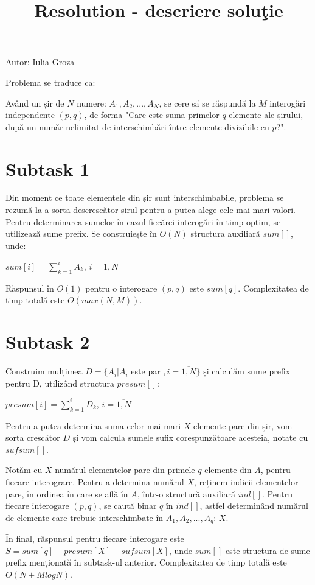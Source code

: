 \documentclass[ro]{problem}
\title{Resolution - descriere soluţie}
\begin{document}
\maketitle

Autor: Iulia Groza

Problema se traduce ca:

\setlength\parindent{24pt} Având un șir de $N$ numere: $A_1, A_2, ..., A_N$, se cere să se răspundă la $M$ interogări independente $(p, q)$, de forma "Care este suma primelor $q$ elemente ale șirului, după un număr nelimitat de interschimbări între elemente divizibile cu $p$?".

\section{Subtask 1}
\noindent Din moment ce toate elementele din șir sunt interschimbabile, problema se rezumă la a sorta descrescător șirul pentru a putea alege cele mai mari valori. Pentru determinarea sumelor în cazul fiecărei interogări în timp optim, se utilizează sume prefix. Se construiește în $O(N)$ structura auxiliară $sum[]$, unde:

$sum[i] = \sum_{k=1}^{i} A_k$, $i=\overline{1,N}$

\noindent Răspunsul în $O(1)$ pentru o interogare $(p, q)$ este $sum[q]$. Complexitatea de timp totală este $O(max(N, M))$.

\section{Subtask 2}
\noindent Construim mulțimea $D = \{A_i | A_i$ este par $, i=\overline{1,N}\}$ și calculăm sume prefix pentru D, utilizând structura $presum[]$:

$presum[i] = \sum_{k=1}^{i} D_k$, $i=\overline{1,N}$

\noindent Pentru a putea determina suma celor mai mari $X$ elemente pare din șir, vom sorta crescător $D$ și vom calcula sumele sufix corespunzătoare acesteia, notate cu $sufsum[]$.

\noindent Notăm cu $X$ numărul elementelor pare din primele $q$ elemente din $A$, pentru fiecare interograre. Pentru a determina numărul $X$, reținem indicii elementelor pare, în ordinea în care se află în $A$, într-o structură auxiliară $ind[]$. Pentru fiecare interogare $(p, q)$, se caută binar $q$ în $ind[]$, astfel determinând numărul de elemente care trebuie interschimbate în $A_1, A_2, ..., A_q$: $X$.

\noindent În final, răspunsul pentru fiecare interogare este $S = sum[q] - presum[X] + sufsum[X]$, unde $sum[]$ este structura de sume prefix menționată în subtask-ul anterior. Complexitatea  de timp totală este $O(N + MlogN)$.
\end{document}
